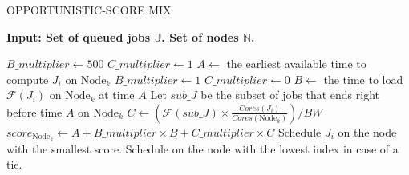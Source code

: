 \documentclass[a4paper]{article}
\newcommand{\Node}[1]{\ensuremath{\mathrm{Node}_{#1}}\xspace}
\newcommand{\inputs}{\ensuremath{\mathcal{F}}\xspace}
\newcommand{\memory}{\ensuremath{\mathcal{M}}\xspace}
\newcommand{\bandwidth}{\mathit{BW}\xspace}
\newcommand{\core}{\mathit{Cores}\xspace}
\newcommand{\jobset}{\ensuremath{\mathbb{J}}\xspace}
\newcommand{\nodeset}{\ensuremath{\mathbb{N}}\xspace}
\begin{document}
\begin{algorithm}[htbp]
\caption{OPPORTUNISTIC-SCORE MIX}
\hspace*{\algorithmicindent} \textbf{Input: Set of queued jobs $\jobset$. Set of nodes $\nodeset$.} \\
\begin{algorithmic}[0]
\ForEach {$J_i \in \jobset$}
	\State $B\_multiplier \gets 500$
	\State $C\_multiplier \gets 1$
	\ForEach {$\Node{k} \in \nodeset$}
		\State $A \gets$ the earliest available time to compute $J_i$ on $\Node{k}$
			\State $B\_multiplier \gets 1$
			\State $C\_multiplier \gets 0$
		\EndIf
		\State $B \gets$ the time to load $\inputs(J_i)$ on $\Node{k}$ at time $A$
		\State Let $\mathit{sub\_J}$ be the subset of jobs that ends right before time $A$ on $\Node{k}$
		\State $C \gets (\inputs(\mathit{sub\_J}) \times \frac{\core(J_i)}{\core(\Node{k})})/\bandwidth$
		\State $score_{\Node{k}} \gets A + B\_multiplier \times B + C\_multiplier \times C$
	\EndFor
	\State Schedule $J_i$ on the node with the smallest score. Schedule on the node with the lowest index in case of a tie.
\EndFor
\end{algorithmic}
\end{algorithm}
\end{document}
